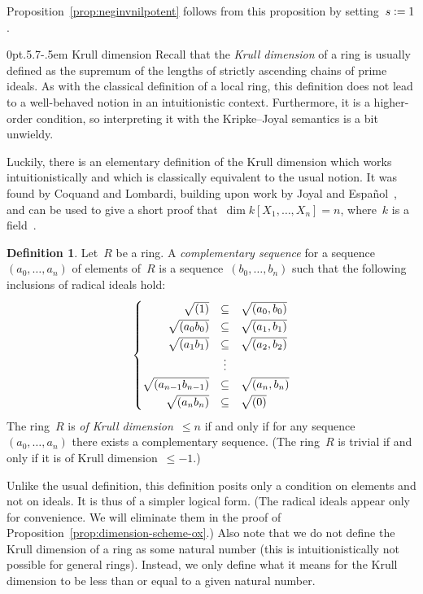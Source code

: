 \documentclass[10pt,reqno,a4paper]{amsbook}
\makeatletter
\theoremstyle{definition}
\newtheorem{defn}{Definition}[section]
\theoremstyle{plain}
\theoremstyle{remark}
\newcommand{\?}{\,{:}\,}
\renewcommand{\_}{\mathpunct{.}\,}
\newcommand{\defeq}{\vcentcolon=}
\def\subsection{\@startsection{subsection}{2}%
  {0pt}{.5\linespacing\@plus.7\linespacing}{-.5em}%
  {\normalfont\bfseries}}
\makeatother
\begin{document}
Proposition~\ref{prop:neginvnilpotent} follows from this proposition by
setting~$s \defeq 1$.


\subsection{Krull dimension}\label{sect:krull-dimension}
Recall that the \emph{Krull dimension} of a
ring is usually defined as the supremum of the lengths of strictly
ascending chains of prime ideals. As with the classical definition of a local ring,
this definition does not lead to a well-behaved notion in an intuitionistic
context. Furthermore, it is a higher-order condition, so interpreting it
with the Kripke--Joyal semantics is a bit unwieldy.

Luckily, there is an elementary definition of the Krull dimension which works
intuitionistically and which is classically equivalent to the usual notion. It
was found by Coquand and Lombardi, building upon work by
Joyal and Español~\cite{dyn:krull-integral,dyn:char-krull}, and can be
used to give a short proof that~$\dim k[X_1,\ldots,X_n] = n$, where~$k$ is a
field~\cite{dyn:krull-dim-polynomial-ring}.

\begin{defn}Let~$R$ be a ring. A \emph{complementary sequence} for a
sequence~$(a_0,\ldots,a_n)$ of elements of~$R$ is a sequence~$(b_0,\ldots,b_n)$
such that the following inclusions of radical ideals hold:
\[ \renewcommand{\arraystretch}{1.3}
\left\{\begin{array}{@{}rcl@{}}
  \sqrt{(1)} &\subseteq& \sqrt{(a_0,b_0)} \\
  \sqrt{(a_0 b_0)} &\subseteq& \sqrt{(a_1,b_1)} \\
  \sqrt{(a_1 b_1)} &\subseteq& \sqrt{(a_2,b_2)} \\
  &\vdots \\
  \sqrt{(a_{n-1} b_{n-1})} &\subseteq& \sqrt{(a_n,b_n)} \\
  \sqrt{(a_n b_n)} &\subseteq& \sqrt{(0)}
\end{array}\right. \]
The ring~$R$ is \emph{of Krull dimension~$\leq n$} if
and only if for any sequence~$(a_0,\ldots,a_n)$ there exists a
complementary sequence. (The ring~$R$ is trivial if and only if it is
of Krull dimension~$\leq -1$.)
\end{defn}
Unlike the usual definition, this definition posits only a condition
on elements and not on ideals. It is thus of a simpler logical form.
(The radical ideals appear only for convenience. We will eliminate them in the
proof of Proposition~\ref{prop:dimension-scheme-ox}.)
Also note that we do not define the Krull dimension of a ring as some natural
number (this is intuitionistically not possible for general rings). Instead, we
only define what it means for the Krull dimension to be less than or equal to
a given natural number.
\end{document}
